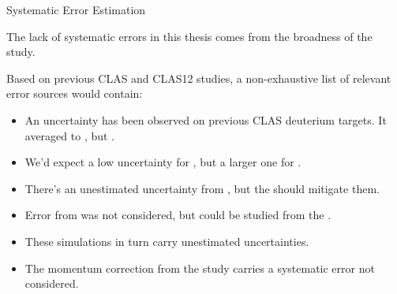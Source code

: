 \begin{frame}{Systematic Error Estimation}
    \label{20.12::systematic_error_estimation}

    The lack of systematic errors in this thesis comes from the broadness of the study.

    \vspace{6pt}

    Based on previous CLAS and CLAS12 studies, a non-exhaustive list of relevant error sources would contain:

    \vspace{6pt}
    \begin{itemize}
        \item
            An uncertainty has been observed on previous CLAS deuterium targets.
            It averaged to , but .

        \item
            We'd expect a low uncertainty for , but a larger one for \ef{$\pi^\pm$}.

        \item
            There's an unestimated uncertainty from , but the  should mitigate them.

        \item
            Error from  was not considered, but could be studied from the .

        \item
            These simulations in turn carry unestimated uncertainties.

        \item
            The momentum correction from the  study carries a systematic error not considered.
    \end{itemize}

\end{frame}
